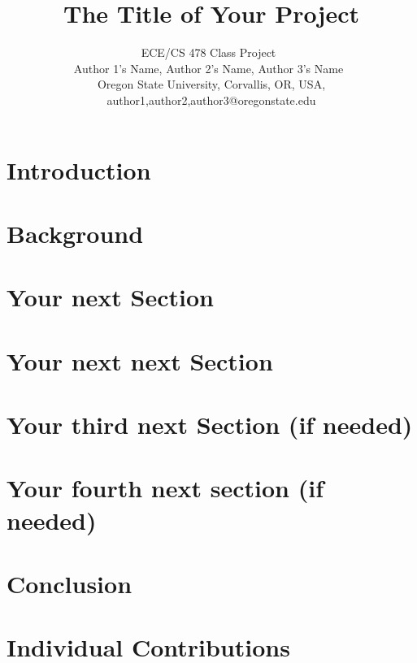 \documentclass[10pt,letterpaper]{IEEEtran}
\begin{document}
\title{The Title of Your Project}

\author{ECE/CS 478 Class Project~\\
Author 1's Name, Author 2's Name, Author 3's Name~\\
\small Oregon State University, Corvallis, OR, USA, {author1,author2,author3}@oregonstate.edu \\
}

\maketitle
\thispagestyle{plain}
\pagestyle{plain}

%


\section{Introduction}


\section{Background}
\label{sec:background}



\section{Your next Section}
\label{sec:xxx}


\section{Your next next Section}
\label{sec:xxxx}


\section{Your third next Section (if needed)}
\label{sec:xxxxxx}


\section{Your fourth next section (if needed)}
\label{sec:evaluation}



\section{Conclusion}
\label{sec:conclusion}


\section{Individual Contributions}
\label{sec:contributions}





%
\end{document}
